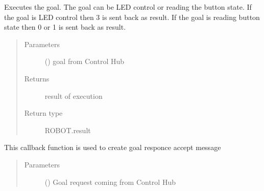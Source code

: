 \documentclass[letterpaper,10pt,english]{sphinxmanual}
\begin{document}
\begin{fulllineitems}

\begin{fulllineitems}
\label{\detokenize{index:Test_Robot.test_robot.test_robot.test_robot_server.GPIOActionServer.execute_callback}}
Executes the goal. The goal can be LED control
or reading the button state.
If the goal is LED control then 3 is sent back as result.
If the goal is reading button state then 0 or 1 is sent back as result.
\begin{quote}\begin{description}
\item[{Parameters}] \leavevmode
{} () \textendash{} goal from Control Hub

\item[{Returns}] \leavevmode
result of execution

\item[{Return type}] \leavevmode
ROBOT.result

\end{description}\end{quote}

\end{fulllineitems}


\begin{fulllineitems}
\label{\detokenize{index:Test_Robot.test_robot.test_robot.test_robot_server.GPIOActionServer.goal_callback}}
This callback function is used to create
goal responce accept message
\begin{quote}\begin{description}
\item[{Parameters}] \leavevmode
{} () \textendash{} Goal request coming from Control Hub


\end{description}
\end{quote}
\end{fulllineitems}
\end{fulllineitems}
\end{document}
